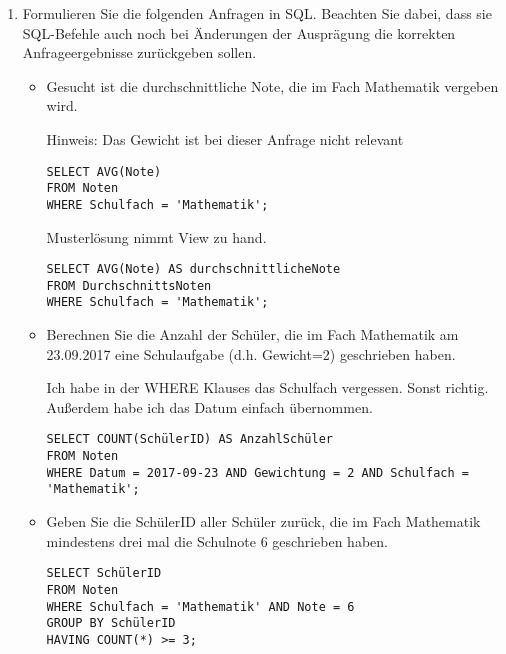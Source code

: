 \documentclass{lehramt-informatik-aufgabe}
\begin{document}
\begin{enumerate}
\item Formulieren Sie die folgenden Anfragen in SQL. Beachten Sie dabei,
dass sie SQL-Befehle auch noch bei Änderungen der Ausprägung die
korrekten Anfrageergebnisse zurückgeben sollen.

\begin{itemize}

%

\item Gesucht ist die durchschnittliche Note, die im Fach Mathematik
vergeben wird.

Hinweis: Das Gewicht ist bei dieser Anfrage nicht relevant

\begin{antwort}
\begin{verbatim}
SELECT AVG(Note)
FROM Noten
WHERE Schulfach = 'Mathematik';
\end{verbatim}
\end{antwort}

Musterlösung nimmt View zu hand.

\begin{antwort}[muster]
\begin{verbatim}
SELECT AVG(Note) AS durchschnittlicheNote
FROM DurchschnittsNoten
WHERE Schulfach = 'Mathematik';
\end{verbatim}
\end{antwort}

%

\item Berechnen Sie die Anzahl der Schüler, die im Fach Mathematik am
23.09.2017 eine Schulaufgabe (d.h. Gewicht=2) geschrieben haben.

\begin{antwort}[muster]
Ich habe in der WHERE Klauses das Schulfach vergessen. Sonst richtig.
Außerdem habe ich das Datum einfach übernommen.
\begin{verbatim}
SELECT COUNT(SchülerID) AS AnzahlSchüler
FROM Noten
WHERE Datum = 2017-09-23 AND Gewichtung = 2 AND Schulfach = 'Mathematik';
\end{verbatim}
\end{antwort}

%

\item Geben Sie die SchülerID aller Schüler zurück, die im Fach
Mathematik mindestens drei mal die Schulnote 6 geschrieben haben.

\begin{antwort}[muster]
\begin{verbatim}
SELECT SchülerID
FROM Noten
WHERE Schulfach = 'Mathematik' AND Note = 6
GROUP BY SchülerID
HAVING COUNT(*) >= 3;
\end{verbatim}
\end{antwort}


\end{itemize}
\end{enumerate}
\end{document}
